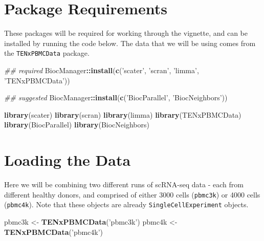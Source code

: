 \documentclass[]{book}
\newenvironment{Shaded}{\begin{snugshade}}{\end{snugshade}}
\newcommand{\CommentTok}[1]{\textcolor[rgb]{0.56,0.35,0.01}{\textit{#1}}}
\newcommand{\KeywordTok}[1]{\textcolor[rgb]{0.13,0.29,0.53}{\textbf{#1}}}
\newcommand{\NormalTok}[1]{#1}
\newcommand{\OperatorTok}[1]{\textcolor[rgb]{0.81,0.36,0.00}{\textbf{#1}}}
\newcommand{\StringTok}[1]{\textcolor[rgb]{0.31,0.60,0.02}{#1}}
\begin{document}
\hypertarget{package-requirements}{%
\section{Package Requirements}\label{package-requirements}}

These packages will be required for working through the vignette, and can be installed by running the code below. The data that we will be using comes from the \texttt{TENxPBMCData} package.

\begin{Shaded}
\begin{Highlighting}[]
\CommentTok{## required}
\NormalTok{BiocManager}\OperatorTok{::}\KeywordTok{install}\NormalTok{(}\KeywordTok{c}\NormalTok{(}\StringTok{'scater'}\NormalTok{, }\StringTok{'scran'}\NormalTok{, }\StringTok{'limma'}\NormalTok{, }\StringTok{'TENxPBMCData'}\NormalTok{))}

\CommentTok{## suggested}
\NormalTok{BiocManager}\OperatorTok{::}\KeywordTok{install}\NormalTok{(}\KeywordTok{c}\NormalTok{(}\StringTok{'BiocParallel'}\NormalTok{, }\StringTok{'BiocNeighbors'}\NormalTok{))}
\end{Highlighting}
\end{Shaded}

\begin{Shaded}
\begin{Highlighting}[]
\KeywordTok{library}\NormalTok{(scater)}
\KeywordTok{library}\NormalTok{(scran)}
\KeywordTok{library}\NormalTok{(limma)}
\KeywordTok{library}\NormalTok{(TENxPBMCData)}
\KeywordTok{library}\NormalTok{(BiocParallel)}
\KeywordTok{library}\NormalTok{(BiocNeighbors)}
\end{Highlighting}
\end{Shaded}

\hypertarget{loading-the-data}{%
\section{Loading the Data}\label{loading-the-data}}

Here we will be combining two different runs of scRNA-seq data - each from different healthy donors, and comprised of either 3000 cells (\texttt{pbmc3k}) or 4000 cells (\texttt{pbmc4k}). Note that these objects are already \texttt{SingleCellExperiment} objects.

\begin{Shaded}
\begin{Highlighting}[]
\NormalTok{pbmc3k <-}\StringTok{ }\KeywordTok{TENxPBMCData}\NormalTok{(}\StringTok{'pbmc3k'}\NormalTok{)}
\NormalTok{pbmc4k <-}\StringTok{ }\KeywordTok{TENxPBMCData}\NormalTok{(}\StringTok{'pbmc4k'}\NormalTok{)}
\end{Highlighting}
\end{Shaded}
\end{document}
